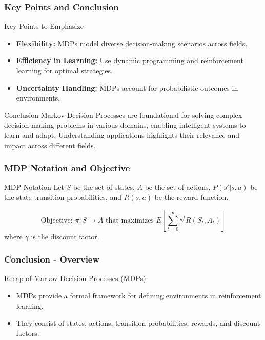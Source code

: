 \documentclass[aspectratio=169]{beamer}
\begin{document}
\begin{frame}[fragile]
    \frametitle{Key Points and Conclusion}
    \begin{block}{Key Points to Emphasize}
        \begin{itemize}
            \item \textbf{Flexibility:} MDPs model diverse decision-making scenarios across fields.
            \item \textbf{Efficiency in Learning:} Use dynamic programming and reinforcement learning for optimal strategies.
            \item \textbf{Uncertainty Handling:} MDPs account for probabilistic outcomes in environments.
        \end{itemize}
    \end{block}

    \begin{block}{Conclusion}
        Markov Decision Processes are foundational for solving complex decision-making problems in various domains, enabling intelligent systems to learn and adapt. Understanding applications highlights their relevance and impact across different fields.
    \end{block}
\end{frame}

\begin{frame}[fragile]
    \frametitle{MDP Notation and Objective}
    \begin{block}{MDP Notation}
        Let \( S \) be the set of states, \( A \) be the set of actions, \( P(s'|s, a) \) be the state transition probabilities, and \( R(s, a) \) be the reward function. 
    \end{block}
    \begin{equation}
        \text{Objective: } \pi: S \rightarrow A \text{ that maximizes } E\left[\sum_{t=0}^\infty \gamma^t R(S_t, A_t)\right]
    \end{equation}
    where \( \gamma \) is the discount factor.
\end{frame}

\begin{frame}[fragile]
    \frametitle{Conclusion - Overview}
    \begin{block}{Recap of Markov Decision Processes (MDPs)}
        \begin{itemize}
            \item MDPs provide a formal framework for defining environments in reinforcement learning.
            \item They consist of states, actions, transition probabilities, rewards, and discount factors.
        \end{itemize}
    \end{block}
\end{frame}
\end{document}
